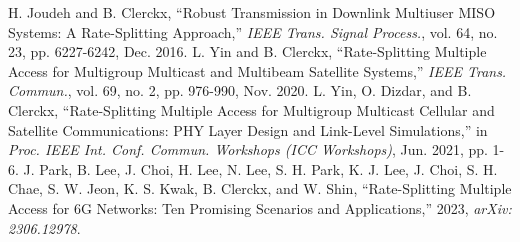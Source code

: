 \documentclass[draftclsnofoot, onecolumn, comsoc, 12pt]{IEEEtran}
\begin{document}
\begin{thebibliography}{1}
 \label{ref:2016 TSP_Bruno_RSMA imperfect CSIT}
H. Joudeh and B. Clerckx, ``Robust Transmission in Downlink Multiuser MISO Systems: A Rate-Splitting Approach,''  \emph{IEEE Trans. Signal Process.}, vol. 64, no. 23, pp. 6227-6242, Dec. 2016.
 \label{ref:TCOM_RSMA for Multibeam Satellite}
L. Yin and B. Clerckx, ``Rate-Splitting Multiple Access for Multigroup Multicast and Multibeam Satellite Systems,''  \emph{IEEE Trans. Commun.}, vol. 69, no. 2, pp. 976-990, Nov. 2020.
 \label{ref:2021ICC_Bruno_RSMAforSatellite}
L. Yin, O. Dizdar, and B. Clerckx, ``Rate-Splitting Multiple Access for Multigroup Multicast Cellular and Satellite Communications: PHY Layer Design and Link-Level Simulations,'' in \emph{Proc. IEEE Int. Conf. Commun. Workshops (ICC Workshops)}, Jun. 2021, pp. 1-6.
\label{ref:2023 Magazine_RSMA for 6G}
J. Park, B. Lee, J. Choi, H. Lee, N. Lee, S. H. Park, K. J. Lee, J. Choi,
S. H. Chae, S. W. Jeon, K. S. Kwak, B. Clerckx, and W. Shin, ``Rate-Splitting Multiple Access for 6G Networks: Ten Promising Scenarios and Applications,'' 2023, \emph{arXiv: 2306.12978}.

\end{thebibliography}
\end{document}
